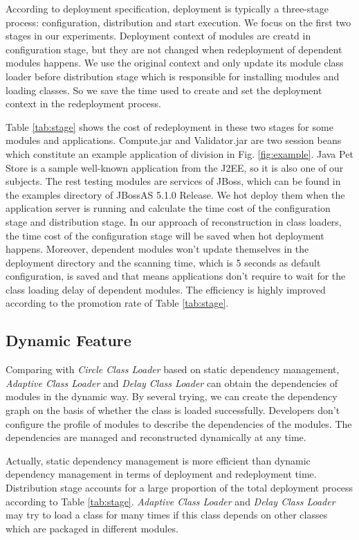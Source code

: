 \documentclass[conference]{IEEEtran}
\begin{document}
According to deployment specification\cite{jsr88}, deployment is typically a three-stage process: configuration, distribution and start execution.
We focus on the first two stages in our experiments.
Deployment context of modules are creatd in configuration stage, but they are not changed when redeployment of dependent modules happens.
We use the original context and only update its module class loader before distribution stage which is responsible for installing modules and loading classes.
So we save the time used to create and set the deployment context in the redeployment process.

Table \ref{tab:stage} shows the cost of redeployment in these two stages for some modules and applications.
Compute.jar and Validator.jar are two session beans which constitute an example application of division in Fig. \ref{fig:example}.
Java Pet Store\cite{java_pet_store} is a sample well-known application from the J2EE\cite{j2ee}, so it is also one of our subjects.
The rest testing modules are services of JBoss, which can be found in the examples directory of JBossAS 5.1.0 Release.
We hot deploy them when the application server is running and calculate the time cost of the configuration stage and distribution stage.
In our approach of reconstruction in class loaders, the time cost of the configuration stage will be saved when hot deployment happens.
Moreover, dependent modules won't update themselves in the deployment directory and the scanning time, which is 5 seconds as default configuration, is saved and that means applications don't require to wait for the class loading delay of dependent modules. 
The efficiency is highly improved according to the promotion rate of Table \ref{tab:stage}.

\subsection{Dynamic Feature}
Comparing with \emph{Circle Class Loader} based on static dependency management, \emph{Adaptive Class Loader} and \emph{Delay Class Loader} can obtain the dependencies of modules in the dynamic way.
By several trying, we can create the dependency graph on the basis of whether the class is loaded successfully.
Developers don't configure the profile of modules to describe the dependencies of the modules.
The dependencies are managed and reconstructed dynamically at any time.

Actually, static dependency management is more efficient than dynamic dependency management in terms of deployment and redeployment time.
Distribution stage accounts for a large proportion of the total deployment process according to Table \ref{tab:stage}.
\emph{Adaptive Class Loader} and \emph{Delay Class Loader} may try to load a class for many times if this class depends on other classes which are packaged in different modules.
\end{document}
